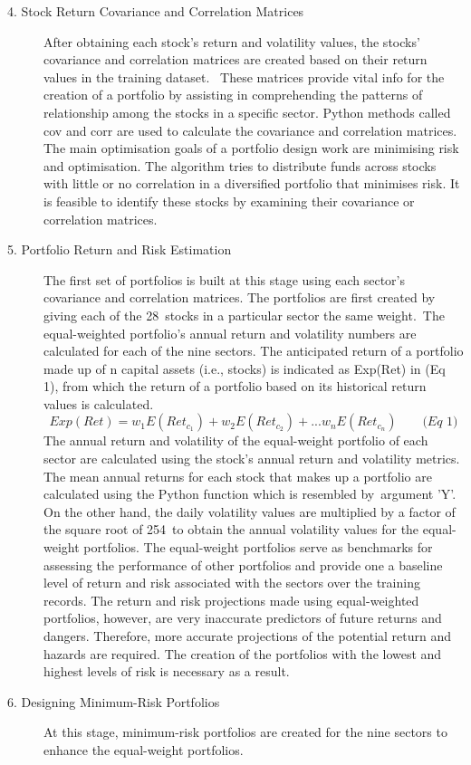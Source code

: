 \begin{description}
   \item[4. Stock Return Covariance and Correlation Matrices] After obtaining each stock's return and volatility values, the stocks' covariance and correlation matrices are created based on their return values in the training dataset.  These matrices provide vital info for the creation of a portfolio by assisting in comprehending the patterns of relationship among the stocks in a specific sector. Python methods called cov and corr are used to calculate the covariance and correlation matrices. The main optimisation goals of a portfolio design work are minimising risk and optimisation. The algorithm tries to distribute funds across stocks with little or no correlation in a diversified portfolio that minimises risk. It is feasible to identify these stocks by examining their covariance or correlation matrices.
   \item[5. Portfolio Return and Risk Estimation] The first set of portfolios is built at this stage using each sector's covariance and correlation matrices. The portfolios are first created by giving each of the 28 stocks in a particular sector the same weight. The equal-weighted portfolio's annual return and volatility numbers are calculated for each of the nine sectors. The anticipated return of a portfolio made up of n capital assets (i.e., stocks) is indicated as Exp(Ret) in (Eq 1), from which the return of a portfolio based on its historical return values is calculated. 
   \[Exp(Ret) = w_{1}E(Ret_{c_{1}}) + w_{2}E(Ret_{c_{2}}) + ... w_{n}E(Ret_{c_{n}}) \qquad \textit{(Eq 1)}\] 
   The annual return and volatility of the equal-weight portfolio of each sector are calculated using the stock's annual return and volatility metrics. The mean annual returns for each stock that makes up a portfolio are calculated using the Python function which is resembled by argument 'Y'.
On the other hand, the daily volatility values are multiplied by a factor of the square root of 254 to obtain the annual volatility values for the equal-weight portfolios. The equal-weight portfolios serve as benchmarks for assessing the performance of other portfolios and provide one a baseline level of return and risk associated with the sectors over the training records. The return and risk projections made using equal-weighted portfolios, however, are very inaccurate predictors of future returns and dangers. Therefore, more accurate projections of the potential return and hazards are required.
The creation of the portfolios with the lowest and highest levels of risk is necessary as a result.
   \item[6. Designing Minimum-Risk Portfolios] At this stage, minimum-risk portfolios are created for the nine sectors to enhance the equal-weight portfolios.

\end{description}
